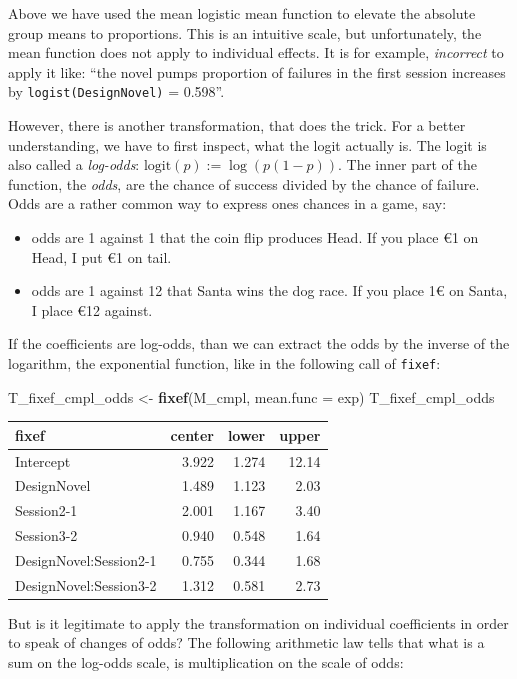 \documentclass[]{svmono}
\newcommand{\euro}{€}
\newenvironment{Shaded}{\begin{snugshade}}{\end{snugshade}}
\newcommand{\KeywordTok}[1]{\textcolor[rgb]{0.13,0.29,0.53}{\textbf{#1}}}
\newcommand{\DataTypeTok}[1]{\textcolor[rgb]{0.13,0.29,0.53}{#1}}
\newcommand{\StringTok}[1]{\textcolor[rgb]{0.31,0.60,0.02}{#1}}
\newcommand{\NormalTok}[1]{#1}
\providecommand{\tightlist}{%
  \setlength{\itemsep}{0pt}\setlength{\parskip}{0pt}}
\begin{document}
Above we have used the mean logistic mean function to elevate the
absolute group means to proportions. This is an intuitive scale, but
unfortunately, the mean function does not apply to individual effects.
It is for example, \emph{incorrect} to apply it like: ``the novel pumps
proportion of failures in the first session increases by
\texttt{logist(DesignNovel)} = 0.598''.

However, there is another transformation, that does the trick. For a
better understanding, we have to first inspect, what the logit actually
is. The logit is also called a \emph{log-odds}:
\(\textrm{logit}(p) := \log(p(1-p))\). The inner part of the function,
the \emph{odds}, are the chance of success divided by the chance of
failure. Odds are a rather common way to express ones chances in a game,
say:

\begin{itemize}
\tightlist
\item
  odds are 1 against 1 that the coin flip produces Head. If you place
  \euro{}1 on Head, I put \euro{}1 on tail.
\item
  odds are 1 against 12 that Santa wins the dog race. If you place
  1\euro{} on Santa, I place \euro{}12 against.
\end{itemize}

If the coefficients are log-odds, than we can extract the odds by the
inverse of the logarithm, the exponential function, like in the
following call of \texttt{fixef}:

\begin{Shaded}
\begin{Highlighting}[]
\NormalTok{T_fixef_cmpl_odds <-}\StringTok{ }\KeywordTok{fixef}\NormalTok{(M_cmpl, }\DataTypeTok{mean.func =}\NormalTok{ exp)}
\NormalTok{T_fixef_cmpl_odds}
\end{Highlighting}
\end{Shaded}

\begin{longtable}[]{@{}lrrr@{}}
\toprule
fixef & center & lower & upper\tabularnewline
\midrule
\endhead
Intercept & 3.922 & 1.274 & 12.14\tabularnewline
DesignNovel & 1.489 & 1.123 & 2.03\tabularnewline
Session2-1 & 2.001 & 1.167 & 3.40\tabularnewline
Session3-2 & 0.940 & 0.548 & 1.64\tabularnewline
DesignNovel:Session2-1 & 0.755 & 0.344 & 1.68\tabularnewline
DesignNovel:Session3-2 & 1.312 & 0.581 & 2.73\tabularnewline
\bottomrule
\end{longtable}

But is it legitimate to apply the transformation on individual
coefficients in order to speak of changes of odds? The following
arithmetic law tells that what is a sum on the log-odds scale, is
multiplication on the scale of odds:
\end{document}
